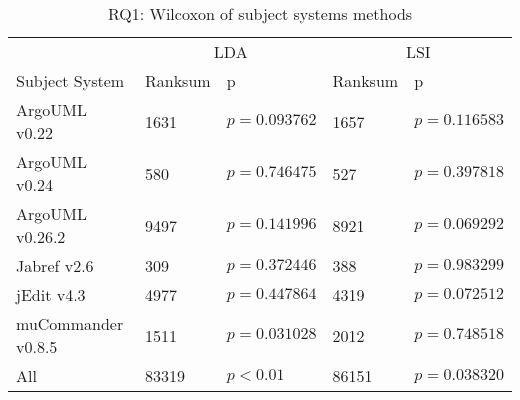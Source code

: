 \begin{table}[t]
\renewcommand{\arraystretch}{1.3}
\centering
\caption{RQ1: Wilcoxon of subject systems methods}
\begin{tabular}{l|ll|ll}
    \toprule
                        & \multicolumn{2}{c|}{LDA}      &  \multicolumn{2}{c}{LSI}  \\
    Subject System      & Ranksum & p & Ranksum & p \\
    \midrule
ArgoUML v0.22 & 1631 & $p = 0.093762$ & 1657 & $p = 0.116583$ \\
ArgoUML v0.24 & 580 & $p = 0.746475$ & 527 & $p = 0.397818$ \\
ArgoUML v0.26.2 & 9497 & $p = 0.141996$ & 8921 & $p = 0.069292$ \\
Jabref v2.6 & 309 & $p = 0.372446$ & 388 & $p = 0.983299$ \\
jEdit v4.3 & 4977 & $p = 0.447864$ & 4319 & $p = 0.072512$ \\
muCommander v0.8.5 & 1511 & $p = 0.031028$ & 2012 & $p = 0.748518$ \\
\midrule
All & 83319 & $p < 0.01$ & 86151 & $p = 0.038320$ \\
    \bottomrule
\end{tabular}
\label{table:rq1:methodstats}
\end{table}



